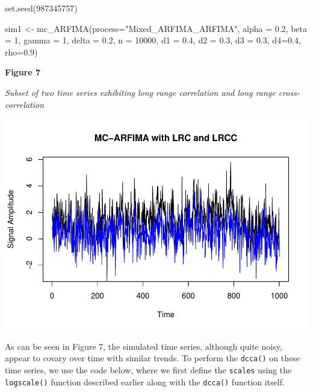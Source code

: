 \documentclass[
  man]{apa6}
\newenvironment{Shaded}{\begin{snugshade}}{\end{snugshade}}
\newcommand{\AttributeTok}[1]{\textcolor[rgb]{0.77,0.63,0.00}{#1}}
\newcommand{\DecValTok}[1]{\textcolor[rgb]{0.00,0.00,0.81}{#1}}
\newcommand{\FloatTok}[1]{\textcolor[rgb]{0.00,0.00,0.81}{#1}}
\newcommand{\FunctionTok}[1]{\textcolor[rgb]{0.00,0.00,0.00}{#1}}
\newcommand{\NormalTok}[1]{#1}
\newcommand{\OtherTok}[1]{\textcolor[rgb]{0.56,0.35,0.01}{#1}}
\newcommand{\StringTok}[1]{\textcolor[rgb]{0.31,0.60,0.02}{#1}}
\begin{document}
\begin{Shaded}
\begin{Highlighting}[]
\FunctionTok{set.seed}\NormalTok{(}\DecValTok{987345757}\NormalTok{)}

\NormalTok{sim1 }\OtherTok{\textless{}{-}} \FunctionTok{mc\_ARFIMA}\NormalTok{(}\AttributeTok{process=}\StringTok{"Mixed\_ARFIMA\_ARFIMA"}\NormalTok{, }\AttributeTok{alpha =} \FloatTok{0.2}\NormalTok{, }
\AttributeTok{beta =} \DecValTok{1}\NormalTok{, }\AttributeTok{gamma =} \DecValTok{1}\NormalTok{, }\AttributeTok{delta =} \FloatTok{0.2}\NormalTok{, }\AttributeTok{n =} \DecValTok{10000}\NormalTok{, }\AttributeTok{d1 =} \FloatTok{0.4}\NormalTok{, }\AttributeTok{d2 =} \FloatTok{0.3}\NormalTok{, }
\AttributeTok{d3 =} \FloatTok{0.3}\NormalTok{, }\AttributeTok{d4=}\FloatTok{0.4}\NormalTok{, }\AttributeTok{rho=}\FloatTok{0.9}\NormalTok{)}
\end{Highlighting}
\end{Shaded}

\textbf{Figure 7}

\emph{Subset of two time series exhibiting long range correlation and long
range cross-correlation}

\includegraphics{fractal_regression_paper_brm_files/figure-latex/unnamed-chunk-15-1.pdf}

As can be seen in Figure 7, the simulated time series, although quite
noisy, appear to covary over time with similar trends. To perform the
\texttt{dcca()} on these time series, we use the code below, where we first
define the \texttt{scales} using the \texttt{logscale()} function described earlier
along with the \texttt{dcca()} function itself.
\end{document}

